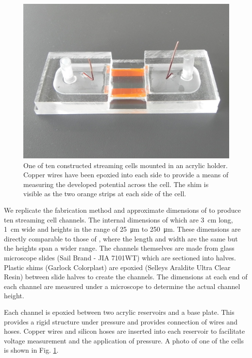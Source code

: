\documentclass[10pt,final,journal]{IEEEtran}
\begin{document}
    \begin{figure}
        \begin{center}
        \includegraphics[width=\linewidth]{Photo_streamingPotential_Assembly_Step3.JPG}
        \end{center}
        \caption{One of ten constructed streaming cells mounted in an acrylic holder. Copper wires have been epoxied into each side to provide a means of measuring the developed potential across the cell. The shim is visible as the two orange strips at each side of the cell.}
        \label{fig:cell}
    \end{figure}

    We replicate the fabrication method and approximate dimensions of \cite{Gu2000} to produce ten streaming cell channels.
    The internal dimensions of which are \SI{3}{\centi\metre} long, \SI{1}{\centi\metre} wide and heights in the range of \SI{25}{\micro\metre} to \SI{250}{\micro\metre}.
    These dimensions are directly comparable to those of \cite{Gu2000}, where the length and width are the same but the heights span a wider range.
    The channels themselves are made from glass microscope slides (Sail Brand - JIA 7101WT) which are sectioned into halves.
    Plastic shims (Garlock Colorplast) are epoxied (Selleys Araldite Ultra Clear Resin) between slide halves to create the channels.
    The dimensions at each end of each channel are measured under a microscope to determine the actual channel height.

    Each channel is epoxied between two acrylic reservoirs and a base plate.
    This provides a rigid structure under pressure and provides connection of wires and hoses.
    Copper wires and silicon hoses are inserted into each reservoir to facilitate voltage measurement and the application of pressure.
    A photo of one of the cells is shown in Fig. \ref{fig:cell}.
    
\end{document}
